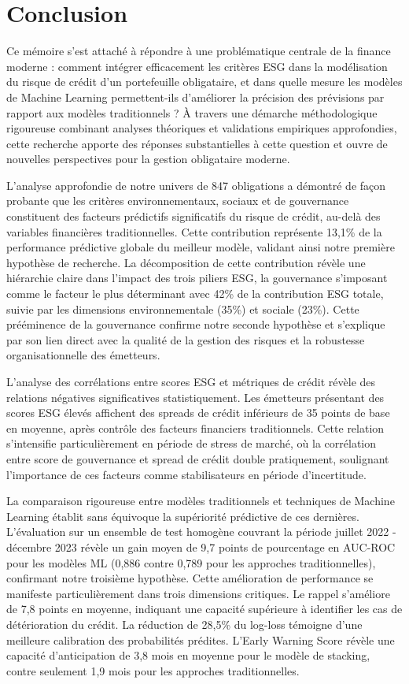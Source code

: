 \chapter{Conclusion}

Ce mémoire s'est attaché à répondre à une problématique centrale de la finance moderne : comment intégrer efficacement les critères ESG dans la modélisation du risque de crédit d'un portefeuille obligataire, et dans quelle mesure les modèles de Machine Learning permettent-ils d'améliorer la précision des prévisions par rapport aux modèles traditionnels ? À travers une démarche méthodologique rigoureuse combinant analyses théoriques et validations empiriques approfondies, cette recherche apporte des réponses substantielles à cette question et ouvre de nouvelles perspectives pour la gestion obligataire moderne.

L'analyse approfondie de notre univers de 847 obligations a démontré de façon probante que les critères environnementaux, sociaux et de gouvernance constituent des facteurs prédictifs significatifs du risque de crédit, au-delà des variables financières traditionnelles. Cette contribution représente 13,1\% de la performance prédictive globale du meilleur modèle, validant ainsi notre première hypothèse de recherche. La décomposition de cette contribution révèle une hiérarchie claire dans l'impact des trois piliers ESG, la gouvernance s'imposant comme le facteur le plus déterminant avec 42\% de la contribution ESG totale, suivie par les dimensions environnementale (35\%) et sociale (23\%). Cette prééminence de la gouvernance confirme notre seconde hypothèse et s'explique par son lien direct avec la qualité de la gestion des risques et la robustesse organisationnelle des émetteurs.

L'analyse des corrélations entre scores ESG et métriques de crédit révèle des relations négatives significatives statistiquement. Les émetteurs présentant des scores ESG élevés affichent des spreads de crédit inférieurs de 35 points de base en moyenne, après contrôle des facteurs financiers traditionnels. Cette relation s'intensifie particulièrement en période de stress de marché, où la corrélation entre score de gouvernance et spread de crédit double pratiquement, soulignant l'importance de ces facteurs comme stabilisateurs en période d'incertitude.

La comparaison rigoureuse entre modèles traditionnels et techniques de Machine Learning établit sans équivoque la supériorité prédictive de ces dernières. L'évaluation sur un ensemble de test homogène couvrant la période juillet 2022 - décembre 2023 révèle un gain moyen de 9,7 points de pourcentage en AUC-ROC pour les modèles ML (0,886 contre 0,789 pour les approches traditionnelles), confirmant notre troisième hypothèse. Cette amélioration de performance se manifeste particulièrement dans trois dimensions critiques. Le rappel s'améliore de 7,8 points en moyenne, indiquant une capacité supérieure à identifier les cas de détérioration du crédit. La réduction de 28,5\% du log-loss témoigne d'une meilleure calibration des probabilités prédites. L'Early Warning Score révèle une capacité d'anticipation de 3,8 mois en moyenne pour le modèle de stacking, contre seulement 1,9 mois pour les approches traditionnelles.

